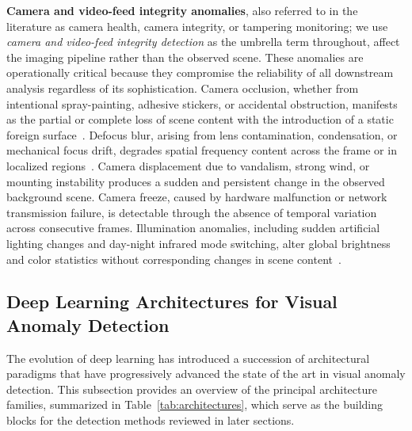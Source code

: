 \documentclass[10pt,a4paper]{article}
\begin{document}
\textbf{Camera and video-feed integrity anomalies}, also referred to in the literature as camera health, camera integrity, or tampering monitoring; we use \emph{camera and video-feed integrity detection} as the umbrella term throughout, affect the imaging pipeline rather than the observed scene. These anomalies are operationally critical because they compromise the reliability of all downstream analysis regardless of its sophistication. Camera occlusion, whether from intentional spray-painting, adhesive stickers, or accidental obstruction, manifests as the partial or complete loss of scene content with the introduction of a static foreign surface~\citep{mantini2019uhctd}. Defocus blur, arising from lens contamination, condensation, or mechanical focus drift, degrades spatial frequency content across the frame or in localized regions~\citep{mantini2017signal}. Camera displacement due to vandalism, strong wind, or mounting instability produces a sudden and persistent change in the observed background scene. Camera freeze, caused by hardware malfunction or network transmission failure, is detectable through the absence of temporal variation across consecutive frames. Illumination anomalies, including sudden artificial lighting changes and day-night infrared mode switching, alter global brightness and color statistics without corresponding changes in scene content~\citep{mantini2023feature_survey}.


\subsection{Deep Learning Architectures for Visual Anomaly Detection}
\label{subsec:dl_architectures}

The evolution of deep learning has introduced a succession of architectural paradigms that have progressively advanced the state of the art in visual anomaly detection. This subsection provides an overview of the principal architecture families, summarized in Table~\ref{tab:architectures}, which serve as the building blocks for the detection methods reviewed in later sections.
\end{document}

